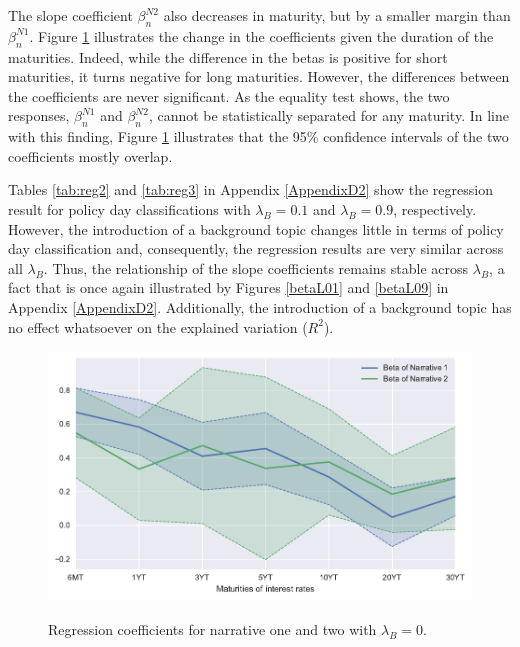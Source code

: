 \documentclass[11pt,a4paper,english,oneside]{book}
\numberwithin{equation}{chapter}
\begin{document}
The slope coefficient $\beta_n^{N2}$ also decreases in maturity, but by a smaller margin than $\beta_n^{N1}$. Figure \ref{betaL00} illustrates the change in the coefficients given the duration of the maturities. Indeed, while the difference in the betas is positive for short maturities, it turns negative for long maturities. %
However, the differences between the coefficients are never significant. As the equality test shows, the two responses, $\beta_n^{N1}$ and $\beta_n^{N2}$, cannot be statistically separated for any maturity. In line with this finding, Figure \ref{betaL00} illustrates that the 95\% confidence intervals of the two coefficients mostly overlap. 

Tables \ref{tab:reg2} and \ref{tab:reg3} in Appendix \ref{AppendixD2} show the regression result for policy day classifications with $\lambda_B=0.1$ and $\lambda_B=0.9$, respectively. However, the introduction of a background topic changes little in terms of policy day classification and, consequently, the regression results are very similar across all $\lambda_B$. Thus, the relationship of the slope coefficients remains stable across $\lambda_B$, a fact that is once again illustrated by Figures \ref{betaL01} and \ref{betaL09} in Appendix \ref{AppendixD2}. Additionally, the introduction of a background topic has no effect whatsoever on the explained variation ($R^2$).

\begin{figure}
	\caption{Regression coefficients for narrative one and two with $\lambda_B=0$.}
	\centering
	\includegraphics[scale=1]{Images/betasLamb0_0.pdf}
	\label{betaL00}
\end{figure}
\end{document}

